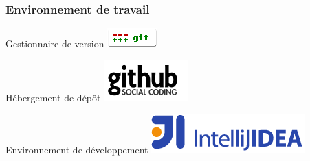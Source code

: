 \begin{frame}\frametitle{Environnement de travail}
\begin{centering}
	\begin{minipage}[c]{.6\linewidth}
		\begin{beamerboxesrounded}[shadow=true,center]{Gestionnaire de version}
			\centering
			\includegraphics[width=.4\linewidth]{../image/gitLogo.png}\hfil
		\end{beamerboxesrounded}
	\end{minipage}
	\vfill
	\begin{minipage}[c]{.6\linewidth}
		\begin{beamerboxesrounded}[shadow=true,center]{Hébergement de dépôt}
			\centering
			\includegraphics[width=.3\linewidth]{../image/githubLogo.png}
		\end{beamerboxesrounded}
	\end{minipage}
	\vfill
	\begin{minipage}[c]{.6\linewidth}
		\begin{beamerboxesrounded}[shadow=true,center]{Environnement de développement}
			\centering
			\includegraphics[width=.4\linewidth]{../image/intellijLogo.png}
		\end{beamerboxesrounded}
	\end{minipage}
	\vfill
\end{centering}
\end{frame}
